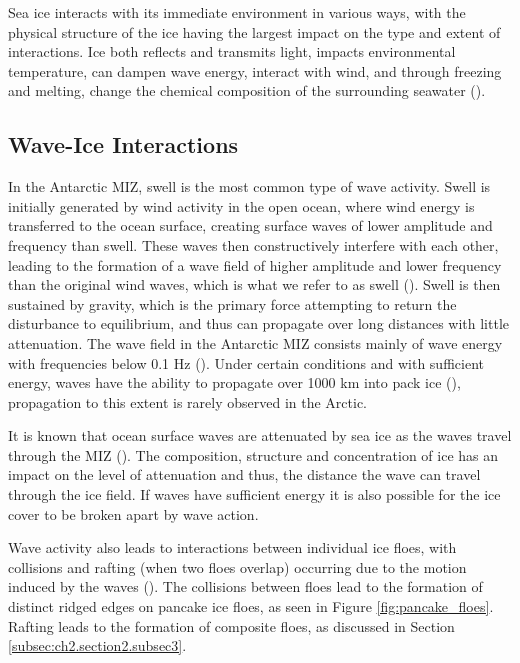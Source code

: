 Sea ice interacts with its immediate environment in various ways, with the physical structure of the ice having the largest impact on the type and extent of interactions. Ice both reflects and transmits light, impacts environmental temperature, can dampen wave energy, interact with wind, and through freezing and melting, change the chemical composition of the surrounding seawater (\cite{roachPhysicsSeasonalSea2025}).

\subsection{Wave-Ice Interactions}
\label{subsec:ch2.section3.subsec1}

In the Antarctic \ac{MIZ}, swell is the most common type of wave activity. Swell is initially generated by wind activity in the open ocean, where wind energy is transferred to the ocean surface, creating surface waves of lower amplitude and frequency than swell. These waves then constructively interfere with each other, leading to the formation of a wave field of higher amplitude and lower frequency than the original wind waves, which is what we refer to as swell (\cite{holthuijsenWavesOceanicCoastal2007}). Swell is then sustained by gravity, which is the primary force attempting to return the disturbance to equilibrium, and thus can propagate over long distances with little attenuation. The wave field in the Antarctic \ac{MIZ} consists mainly of wave energy with frequencies below 0.1 Hz (\cite{thomsonWavePropagationMarginal2022}). Under certain conditions and with sufficient energy, waves have the ability to propagate over 1000 km into pack ice (\cite{voermansFinelyresolvedAlongtrackWave2024}), propagation to this extent is rarely observed in the Arctic.

It is known that ocean surface waves are attenuated by sea ice as the waves travel through the \ac{MIZ} (\cite{williamsWaveIceInteractions2013}). The composition, structure and concentration of ice has an impact on the level of attenuation and thus, the distance the wave can travel through the ice field. If waves have sufficient energy it is also possible for the ice cover to be broken apart by wave action.

Wave activity also leads to interactions between individual ice floes, with collisions and rafting (when two floes overlap) occurring due to the motion induced by the waves (\cite{daiWaveRaftingEquilibrium2004}). The collisions between floes lead to the formation of distinct ridged edges on pancake ice floes, as seen in Figure \ref{fig:pancake_floes}. Rafting leads to the formation of composite floes, as discussed in Section \ref{subsec:ch2.section2.subsec3}.

